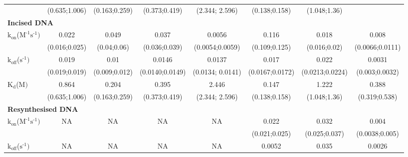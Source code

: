 \begin{table}[H]
\begin{tabular}{lccccccc}
		& (0.635;1.006)     & (0.163;0.259)             & (0.373;0.419)		&(2.344; 2.596)&(0.138;0.158)     &  (1.048;1.36)  &   \\
		\multicolumn{8}{l}{\textbf{Incised DNA}} \\
		$\text{k}_{\text{on}}$({\textmu}$\text{M}^{\text{-1}}\text{s}^{\text{-1}})$    & 0.022                     & 0.049                   & 0.037                 &  0.0056             & 0.116                   &0.018                    & 0.008    \\
		& (0.016;0.025)     & (0.04;0.06)   					&(0.036;0.039) 		 & (0.0054;0.0059)&(0.109;0.125)    &(0.016;0.02)    	& (0.0066;0.0111)    \\
		$\text{k}_{\text{off}}$($\text{s}^{\text{-1}})$                                              & 0.019                     & 0.01                   & 0.0146               & 0.0137                & 0.017                   & 0.022                 &0.0031     \\
		& (0.019;0.019)     & (0.009;0.012)             & (0.0140;0.0149)&(0.0134; 0.0141)&(0.0167;0.0172)     &  (0.0213;0.0224)    & (0.003;0.0032)  \\
		$\text{K}_{\text{d}}$({\textmu}$\text{M})$                                                   & 0.864                     & 0.204                   & 0.395                 &2.446                 &0.147                    &1.222                   &0.388    \\
		& (0.635;1.006)     & (0.163;0.259)             & (0.373;0.419)		&(2.344; 2.596)&(0.138;0.158)     &  (1.048;1.36)  					& (0.319;0.538)   \\
		\multicolumn{8}{l}{\textbf{Resynthesised DNA}} \\
		$\text{k}_{\text{on}}$({\textmu}$\text{M}^{\text{-1}}\text{s}^{\text{-1}})$    & NA                          & NA                        & NA                      &  NA                    & 0.022                   &0.032                    &0.004    \\
		&                               &                             &                            &                          &(0.021;0.025)    &(0.025;0.037)    & (0.0038;0.005)    \\
		$\text{k}_{\text{off}}$($\text{s}^{\text{-1}})$                                             & NA                          &NA                          & NA                      & NA                     & 0.0052                  & 0.035                   &0.0026     \\

\end{tabular}
\end{table}

